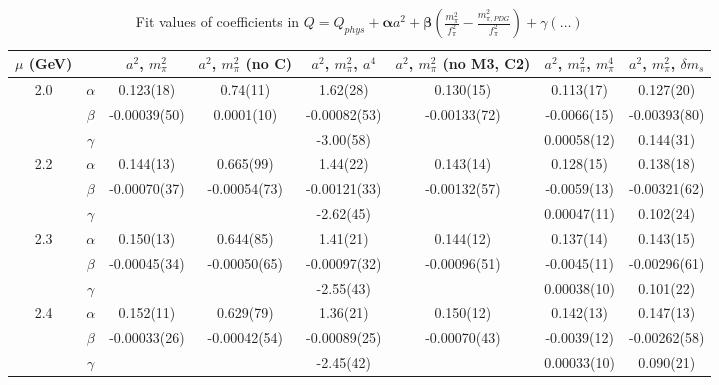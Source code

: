 \documentclass[12pt]{extarticle}
\begin{document}
\begin{table}[h!]
\begin{center}
\begin{tabular}{|c c|c|c|c|c|c|c|}
\hline
$\mu$ (GeV) &  & $a^2$, $m_\pi^2$& $a^2$, $m_\pi^2$ (no C)& $a^2$, $m_\pi^2$, $a^4$& $a^2$, $m_\pi^2$ (no M3, C2)& $a^2$, $m_\pi^2$, $m_\pi^4$& $a^2$, $m_\pi^2$, $\delta m_s$\\
\hline
\multirow{3}{0.5in}{2.0} & $\alpha$ & 0.123(18)& 0.74(11)& 1.62(28)& 0.130(15)& 0.113(17)& 0.127(20)\\
 & $\beta$ & -0.00039(50)& 0.0001(10)& -0.00082(53)& -0.00133(72)& -0.0066(15)& -0.00393(80)\\
 & $\gamma$ &  &  & -3.00(58)&  & 0.00058(12)& 0.144(31)\\
\hline
\multirow{3}{0.5in}{2.2} & $\alpha$ & 0.144(13)& 0.665(99)& 1.44(22)& 0.143(14)& 0.128(15)& 0.138(18)\\
 & $\beta$ & -0.00070(37)& -0.00054(73)& -0.00121(33)& -0.00132(57)& -0.0059(13)& -0.00321(62)\\
 & $\gamma$ &  &  & -2.62(45)&  & 0.00047(11)& 0.102(24)\\
\hline
\multirow{3}{0.5in}{2.3} & $\alpha$ & 0.150(13)& 0.644(85)& 1.41(21)& 0.144(12)& 0.137(14)& 0.143(15)\\
 & $\beta$ & -0.00045(34)& -0.00050(65)& -0.00097(32)& -0.00096(51)& -0.0045(11)& -0.00296(61)\\
 & $\gamma$ &  &  & -2.55(43)&  & 0.00038(10)& 0.101(22)\\
\hline
\multirow{3}{0.5in}{2.4} & $\alpha$ & 0.152(11)& 0.629(79)& 1.36(21)& 0.150(12)& 0.142(13)& 0.147(13)\\
 & $\beta$ & -0.00033(26)& -0.00042(54)& -0.00089(25)& -0.00070(43)& -0.0039(12)& -0.00262(58)\\
 & $\gamma$ &  &  & -2.45(42)&  & 0.00033(10)& 0.090(21)\\
\hline
\end{tabular}
\caption{Fit values of coefficients in $Q = Q_{phys} + \mathbf{\alpha} a^2 + \mathbf{\beta}\left(\frac{m_\pi^2}{f_\pi^2}-\frac{m_{\pi,PDG}^2}{f_\pi^2}\right) + \gamma(\ldots)$}
\end{center}
\end{table}






\end{document}
